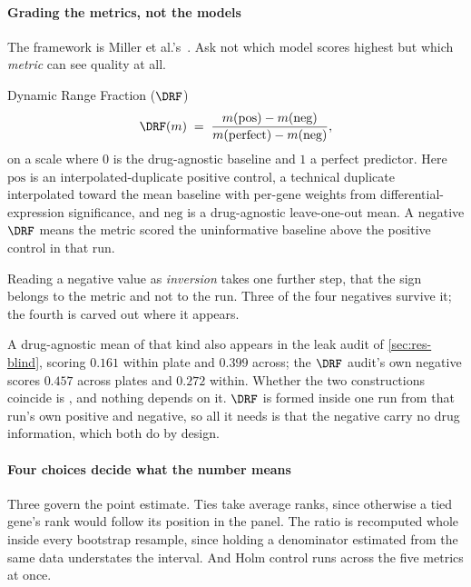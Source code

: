 \paragraph{Grading the metrics, not the models} The framework is Miller
et al.'s~\cite{miller}. Ask not which model scores highest but which
\emph{metric} can see quality at all.

\begin{defn}{Dynamic Range Fraction ($\DRF$)}
\begin{equation}
 \DRF(m) \;=\; \frac{m(\textrm{pos}) - m(\textrm{neg})}%
 {m(\textrm{perfect}) - m(\textrm{neg})},
\end{equation}
on a scale where $0$ is the drug-agnostic baseline and $1$ a perfect predictor.
Here $\textrm{pos}$ is an interpolated-duplicate positive control, a technical
duplicate interpolated toward the mean baseline with per-gene weights from
differential-expression significance, and $\textrm{neg}$ is a drug-agnostic
leave-one-out mean. A negative $\DRF$ means the metric scored the uninformative
baseline above the positive control in that run.
\end{defn}

Reading a negative value as \emph{inversion} takes one further step, that the
sign belongs to the metric and not to the run. Three of the four negatives survive it; the
fourth is carved out where it appears.

A drug-agnostic mean of that kind also appears in the leak audit of
\cref{sec:res-blind}, scoring $0.161$ within plate and $0.399$ across; the
$\DRF$ audit's own negative scores $0.457$ across plates and $0.272$ within.
Whether the two constructions coincide is , and nothing
depends on it. $\DRF$ is formed inside one run from that run's own positive and
negative, so all it needs is that the negative carry no drug information, which
both do by design.

\paragraph{Four choices decide what the number means} Three govern the point
estimate. Ties take average ranks, since otherwise a tied gene's rank would
follow its position in the panel. The ratio is recomputed whole inside every bootstrap
resample, since holding a denominator estimated from the same data understates
the interval. And Holm control runs across the five metrics at once.

